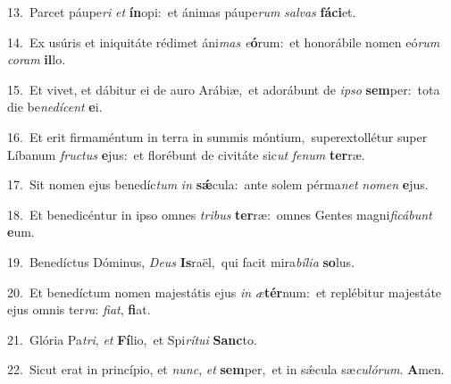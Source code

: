 {\numbfont\textcolor{\numbcolor}{13.}}~Parcet páupe\textit{ri} \textit{et} \textbf{ín}\-opi:~\star et ánimas páupe\textit{rum} \textit{sal}\-\textit{vas} \textbf{fá}\-\textbf{ci}et.\par
{\numbfont\textcolor{\numbcolor}{14.}}~Ex usúris et iniquitáte rédimet áni\textit{mas} \textit{e}\-\textbf{ó}rum:~\star et honorábile nomen eó\textit{rum} \textit{co}\-\textit{ram} \textbf{il}\-lo.\par
{\numbfont\textcolor{\numbcolor}{15.}}~Et vivet, et dábitur ei de auro Arábiæ,~\dagger et adorábunt de \textit{ip}\-\textit{so} \textbf{sem}\-per:~\star tota die be\-\textit{ne}\-\textit{dí}\textit{cent} \textbf{e}\-i.\par
{\numbfont\textcolor{\numbcolor}{16.}}~Et erit firmaméntum in terra in summis móntium,~\dagger superextollétur super Líbanum \textit{fruc}\-\textit{tus} \textbf{e}\-jus:~\star et florébunt de civitáte sic\textit{ut} \textit{fe}\-\textit{num} \textbf{ter}\-ræ.\par
{\numbfont\textcolor{\numbcolor}{17.}}~Sit nomen ejus benedíc\textit{tum} \textit{in} \textbf{sǽ}\-cula:~\star ante solem pérma\textit{net} \textit{no}\-\textit{men} \textbf{e}\-jus.\par
{\numbfont\textcolor{\numbcolor}{18.}}~Et benedicéntur in ipso omnes \textit{tri}\-\textit{bus} \textbf{ter}\-ræ:~\star omnes Gentes magni\-\textit{fi}\-\textit{cá}\textit{bunt} \textbf{e}\-um.\par
{\numbfont\textcolor{\numbcolor}{19.}}~Benedíctus Dóminus, \textit{De}\-\textit{us} \textbf{Is}\-raël,~\star qui facit mira\-\textit{bí}\-\textit{li}\textit{a} \textbf{so}\-lus.\par
{\numbfont\textcolor{\numbcolor}{20.}}~Et benedíctum nomen majestátis ejus \textit{in} \textit{æ}\-\textbf{tér}num:~\star et replébitur majestáte ejus omnis ter\-\textit{ra}\-: \textit{fi}\-\textit{at}, \textbf{fi}\-at.\par
{\numbfont\textcolor{\numbcolor}{21.}}~Glória Pa\-\textit{tri}\-, \textit{et} \textbf{Fí}\-lio,~\star et Spi\-\textit{rí}\-\textit{tu}\textit{i} \textbf{Sanc}\-to.\par
{\numbfont\textcolor{\numbcolor}{22.}}~Sicut erat in princípio, et \textit{nunc}\-, \textit{et} \textbf{sem}\-per,~\star et in sǽcula sæ\-\textit{cu}\-\textit{ló}\textit{rum}. \textbf{A}\-men.\par
